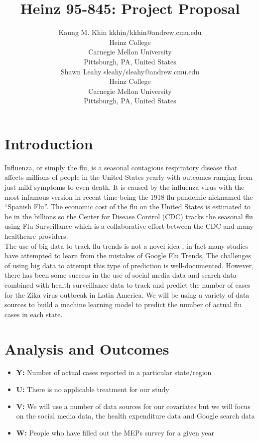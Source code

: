\documentclass[twoside,11pt]{article}
\begin{document}
\title{Heinz 95-845: Project Proposal}

\author{\name Kaung M. Khin \email kkhin/kkhin@andrew.cmu.edu \\
       \addr Heinz College\\
       Carnegie Mellon University\\
       Pittsburgh, PA, United States \\
       \AND
       \name Shawn Leahy \email sleahy/sleahy@andrew.cmu.edu \\
       \addr Heinz College\\
       Carnegie Mellon University\\
       Pittsburgh, PA, United States}
\maketitle
\section{Introduction}
Influenza, or simply the flu, is a seasonal contagious respiratory disease that
affects millions of people in the United States yearly with outcomes ranging
from just mild symptoms to even death. \citep{cdc} It is caused by the influenza virus with
the most infamous version in recent time being the 1918 flu pandemic nicknamed
the “Spanish Flu”. The economic cost of the flu on the United States is
estimated to be in the billions \citep{rolfes_etal._2017} so the Center for Disease Control (CDC) tracks
the seasonal flu using Flu Surveillance which is a collaborative effort between
the CDC and many healthcare providers. \\
The use of big data to track flu trends is not a novel idea \citep{ginsberg_2009}, in fact many
studies have attempted to learn from the mistakes of Google Flu Trends. The
challenges of using big data to attempt this type of prediction is
well-documented. \citep{lazer_kennedy_king_vespignani_2014} However, there has been some success in the use of social media
data and search data combined with health surveillance data to track and predict
the number of cases for the Zika virus outbreak in Latin America. \citep{mcgough_brownstein_hawkins_santillana_2017} We will be
using a variety of data sources to build a machine learning model to predict the
number of actual flu cases in each state.
\section{Analysis and Outcomes} \label{details}
\begin{itemize}
\item \textbf{Y:} Number of actual cases reported in a particular state/region
\item \textbf{U:} There is no applicable treatment for our study
\item \textbf{V:} We will use a number of data sources for our covariates but we will focus on the social media data, the health expenditure data and Google search data
\item \textbf{W:} People who have filled out the MEPs survey for a given year
\end{itemize} 
\end{document}
